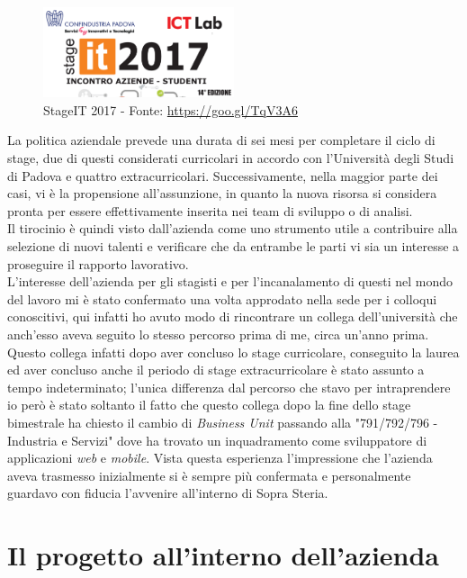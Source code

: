 	\begin{figure}[H]
		\centering
	   	\includegraphics[width=0.5\textwidth]{immagini/StageIT}
	   	\caption{StageIT 2017 - Fonte: \url{https://goo.gl/TqV3A6}}
	\end{figure}


La politica aziendale prevede una durata di sei mesi per completare il ciclo di stage, due di questi considerati curricolari in accordo con l'Università degli Studi di Padova e quattro extracurricolari. Successivamente, nella maggior parte dei casi, vi è la propensione all'assunzione, in quanto la nuova risorsa si considera pronta per essere effettivamente inserita nei team di sviluppo o di analisi.\\

Il tirocinio è quindi visto dall'azienda come uno strumento utile a contribuire alla selezione di nuovi talenti e verificare che da entrambe le parti vi sia un interesse a proseguire il rapporto lavorativo.\\

L'interesse dell'azienda per gli stagisti e per l'incanalamento di questi nel mondo del lavoro mi è stato confermato una volta approdato nella sede per i colloqui conoscitivi, qui infatti ho avuto modo di rincontrare un collega dell'università che anch'esso aveva seguito lo stesso percorso prima di me, circa un'anno prima. Questo collega infatti dopo aver concluso lo stage curricolare, conseguito la laurea ed aver concluso anche il periodo di stage extracurricolare è stato assunto a tempo indeterminato; l'unica differenza dal percorso che stavo per intraprendere io però è stato soltanto il fatto che questo collega dopo la fine dello stage bimestrale ha chiesto il cambio di \textit{Business Unit} passando alla "791/792/796 - Industria e Servizi" dove ha trovato un inquadramento come sviluppatore di applicazioni \textit{web} e \textit{mobile}. Vista questa esperienza l'impressione che l'azienda aveva trasmesso inizialmente si è sempre più confermata e personalmente guardavo con fiducia l'avvenire all'interno di Sopra Steria.

\section{Il progetto all'interno dell'azienda}

